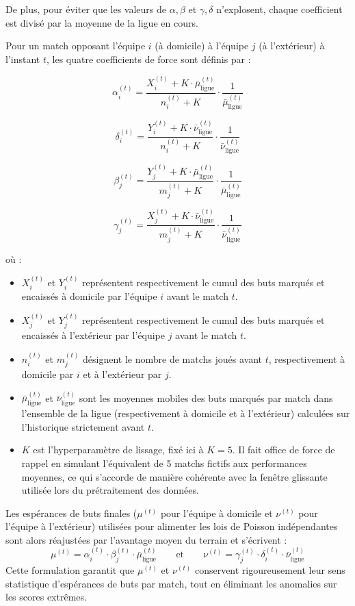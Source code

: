 De plus, pour éviter que les valeurs de $\alpha, \beta$ et $\gamma, \delta$ 
n'explosent, chaque coefficient est divisé par la moyenne de la ligue en cours.

\noindent Pour un match opposant l'équipe $i$ (à domicile) à l'équipe $j$ (à l'extérieur) à 
l'instant $t$, les quatre coefficients de force sont définis par :

\[
\alpha_i^{(t)} = \frac{X_i^{(t)} + K \cdot \bar{\mu}_{\text{ligue}}^{(t)}}
{n_i^{(t)} + K} \cdot \frac{1}{\bar{\mu}_{\text{ligue}}^{(t)}}
\]

\[
\delta_i^{(t)} = \frac{Y_i^{(t)} + K \cdot \bar{\nu}_{\text{ligue}}^{(t)}}
{n_i^{(t)} + K} \cdot \frac{1}{\bar{\nu}_{\text{ligue}}^{(t)}}
\]

\[
\beta_j^{(t)} = \frac{Y_j^{(t)} + K \cdot \bar{\mu}_{\text{ligue}}^{(t)}}
{m_j^{(t)} + K} \cdot \frac{1}{\bar{\mu}_{\text{ligue}}^{(t)}}
\]

\[
\gamma_j^{(t)} = \frac{X_j^{(t)} + K \cdot \bar{\nu}_{\text{ligue}}^{(t)}}
{m_j^{(t)} + K} \cdot \frac{1}{\bar{\nu}_{\text{ligue}}^{(t)}}
\]

où :
\begin{itemize}
    \item $X_i^{(t)}$ et $Y_i^{(t)}$ représentent respectivement le cumul des 
    buts marqués et encaissés à domicile par l'équipe $i$ avant le match $t$.
    \item $X_j^{(t)}$ et $Y_j^{(t)}$ représentent respectivement le cumul des 
    buts marqués et encaissés à l'extérieur par l'équipe $j$ avant le match $t$.
    \item $n_i^{(t)}$ et $m_j^{(t)}$ désignent le nombre de matchs joués avant
     $t$, respectivement à domicile par $i$ et à l'extérieur par $j$.
    \item $\bar{\mu}_{\text{ligue}}^{(t)}$ et $\bar{\nu}_{\text{ligue}}^{(t)}$ sont 
    les moyennes mobiles des buts marqués par match dans l'ensemble de la ligue 
    (respectivement à domicile et à l'extérieur) calculées sur l'historique strictement 
    avant $t$.
    \item $K$ est l'hyperparamètre de lissage, fixé ici à $K = 5$. Il fait office 
    de force de rappel en simulant l'équivalent de 5 matchs fictifs aux performances 
    moyennes, ce qui s'accorde de manière cohérente avec la fenêtre glissante 
    utilisée lors du prétraitement des données.
\end{itemize}

Les espérances de buts finales ($\mu^{(t)}$ pour l'équipe à domicile et $\nu^{(t)}$ 
pour l'équipe à l'extérieur) utilisées pour alimenter les lois de Poisson 
indépendantes sont alors réajustées par l'avantage moyen du terrain et s'écrivent :
\[
\mu^{(t)} = \alpha_i^{(t)} \cdot \beta_j^{(t)} \cdot \bar{\mu}_{\text{ligue}}^{(t)} 
\qquad \text{et} \qquad \nu^{(t)} = \gamma_j^{(t)} \cdot \delta_i^{(t)} \cdot 
\bar{\nu}_{\text{ligue}}^{(t)}
\]
Cette formulation garantit que $\mu^{(t)}$ et $\nu^{(t)}$ conservent rigoureusement 
leur sens statistique d'espérances de buts par match, tout en 
éliminant les anomalies sur les scores extrêmes.

